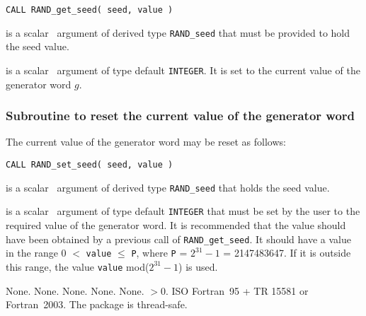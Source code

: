 \documentclass{galahad}
\newcommand{\packagename}{RAND}
\begin{document}
\hskip0.5in
{\tt CALL \packagename\_get\_seed( seed, value )}

\vspace*{-2mm}
\begin{description}
 is a scalar \intentin\ argument of derived type
{\tt \packagename\_seed} that must be provided to hold the seed value.

 is a scalar \intentout\ argument of type default
{\tt INTEGER}.
It is set to the current value of the generator \linebreak word $g$.
\end{description}


\subsubsection{Subroutine to reset the current value of the generator word}
The current value of the generator word may be reset as follows:
\vspace*{1mm}

\hskip0.5in
{\tt CALL \packagename\_set\_seed( seed, value )}

\vspace*{-2mm}
\begin{description}
 is a scalar \intentout\ argument of derived type
{\tt \packagename\_seed}  that holds the seed value.

 is a scalar \intentin\ argument of type default
{\tt INTEGER} that
 must be set by the user to the required value of the generator word. It
 is recommended that the value
 should have been obtained by a previous call of {\tt \packagename\_get\_seed}.
 It should have a value in the range 0 $<$ {\tt value} $\leq$ {\tt P},
 where {\tt P} =
 $2^{31}  - 1$  = 2147483647. If it is outside this range, the value
 {\tt value} mod($2^{31}  - 1$) is used.

\end{description}


\galgeneral

\galcommon None.
\galworkspace None.
\galroutines None.
\galmodules None.
\galio None.
 $> 0$.
\galportability ISO Fortran~95 + TR 15581 or Fortran~2003.
The package is thread-safe.

\end{document}

